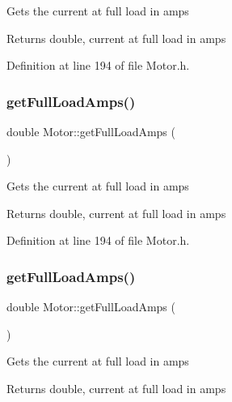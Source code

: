 Gets the current at full load in amps

\begin{DoxyReturn}{Returns}
double, current at full load in amps 
\end{DoxyReturn}


Definition at line 194 of file Motor.\+h.

\mbox{\label{class_motor_a612eb0dabb9623ee8e0866046527d16a}} 
\subsubsection{\texorpdfstring{get\+Full\+Load\+Amps()}{getFullLoadAmps()}\hspace{0.1cm}{\footnotesize\ttfamily [2/3]}}
{\footnotesize\ttfamily double Motor\+::get\+Full\+Load\+Amps (\begin{DoxyParamCaption}{ }\end{DoxyParamCaption})\hspace{0.3cm}{\ttfamily [inline]}}

Gets the current at full load in amps

\begin{DoxyReturn}{Returns}
double, current at full load in amps 
\end{DoxyReturn}


Definition at line 194 of file Motor.\+h.

\mbox{\label{class_motor_a612eb0dabb9623ee8e0866046527d16a}} 
\subsubsection{\texorpdfstring{get\+Full\+Load\+Amps()}{getFullLoadAmps()}\hspace{0.1cm}{\footnotesize\ttfamily [3/3]}}
{\footnotesize\ttfamily double Motor\+::get\+Full\+Load\+Amps (\begin{DoxyParamCaption}{ }\end{DoxyParamCaption})\hspace{0.3cm}{\ttfamily [inline]}}

Gets the current at full load in amps

\begin{DoxyReturn}{Returns}
double, current at full load in amps 
\end{DoxyReturn}


